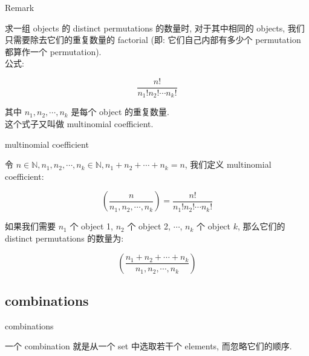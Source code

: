 \documentclass{qlnotes-export}
\begin{document}
\begin{qlremark}{Remark}

求一组 objects 的 distinct permutations 的数量时, 对于其中相同的 objects, 我们只需要除去它们的重复数量的 factorial (即: 它们自己内部有多少个 permutation 都算作一个 permutation).\\
公式:

\[\frac{n!}{n_{1}!n_{2}!\cdots n_{k}!}\]

其中 \(n_{1},n_{2},\cdots,n_{k}\) 是每个 object 的重复数量.\\
这个式子又叫做 multinomial coefficient.

\begin{definition}{multinomial coefficient}\label{def-01-combinatorics-prob-space-multinomial-coefficient}

令 \(n \in {\mathbb{N}},n_{1},n_{2},\cdots,n_{k} \in {\mathbb{N}},n_{1} + n_{2} + \cdots + n_{k} = n\), 我们定义 multinomial coefficient:

\[\left( \frac{n}{n_{1},n_{2},\cdots,n_{k}} \right) = \frac{n!}{n_{1}!n_{2}!\cdots n_{k}!}\]

\end{definition}

\begin{proposition}\label{prop-01-combinatorics-prob-space-proposition-001}

如果我们需要 \(n_{1}\) 个 object 1, \(n_{2}\) 个 object 2, \(\cdots\), \(n_{k}\) 个 object \(k\), 那么它们的 distinct permutations 的数量为:

\[\left( \frac{n_{1} + n_{2} + \cdots + n_{k}}{n_{1},n_{2},\cdots,n_{k}} \right)\]

\end{proposition}

\end{qlremark}

\subsection{combinations}\label{combinations}

\begin{definition}{combinations}\label{def-01-combinatorics-prob-space-combinations}

一个 combination 就是从一个 set 中选取若干个 elements, 而忽略它们的顺序.

\end{definition}
\end{document}
